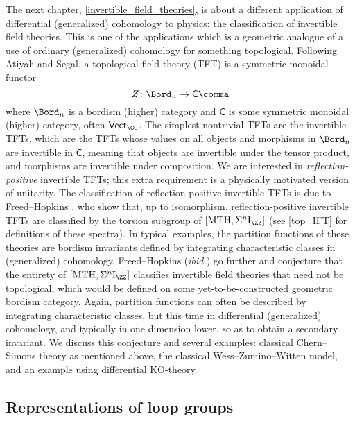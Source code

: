 The next chapter, \cref{invertible_field_theories}, is about a different application of differential (generalized)
cohomology to physics: the classification of invertible field theories. This is one of the applications which is a
geometric analogue of a use of ordinary (generalized) cohomology for something topological. Following Atiyah and
Segal, a topological field theory (TFT) is a symmetric monoidal functor
\[Z\colon\Bord_n\to\mathsf C\comma\]
where $\Bord_n$ is a bordism (higher) category and $\mathsf C$ is some symmetric monoidal (higher) category, often
$\mathsf{Vect}_{\CC}$. The simplest nontrivial TFTs are the invertible TFTs, which are the TFTs whose values on all
objects and morphisms in $\Bord_n$ are invertible in $\mathsf C$, meaning that objects are invertible under the
tensor product, and morphisms are invertible under composition.
We are interested in \emph{reflection-positive} invertible TFTs; this extra requirement is a physically motivated
version of unitarity. The classification of reflection-positive invertible TFTs is due to
Freed--Hopkins \cite{FH21}, who show that, up to isomorphism, reflection-positive invertible TFTs are classified by
the torsion subgroup of $[\mathrm{MTH}, \Sigma^n \mathrm I_\ZZ]$ (see \cref{top_IFT} for definitions of these
spectra). In typical examples, the partition functions of these theories are bordism invariants defined by
integrating characteristic classes in (generalized) cohomology. Freed--Hopkins (\textit{ibid.}) go further and
conjecture that the entirety of $[\mathrm{MTH}, \Sigma^n \mathrm I_\ZZ]$ classifies invertible field theories that
need not be topological, which would be defined on some yet-to-be-constructed geometric bordism category. Again,
partition functions can often be described by integrating characteristic classes, but this time in differential
(generalized) cohomology, and typically in one dimension lower, so as to obtain a secondary invariant. We discuss
this conjecture and several examples: classical Chern--Simons theory as mentioned above, the classical
Wess--Zumino--Witten model, and an example using differential $\mathrm{KO}$-theory.

\subsection*{Representations of loop groups}

